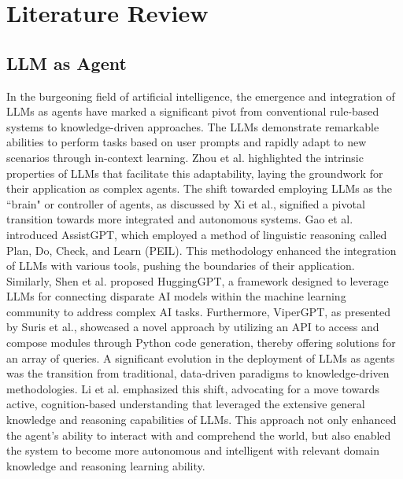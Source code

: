 \documentclass[lettersize,journal]{IEEEtran}
\begin{document}
\section{Literature Review}

\subsection{LLM as Agent}
In the burgeoning field of artificial intelligence, the emergence and integration of LLMs as agents have marked a significant pivot from conventional rule-based systems to knowledge-driven approaches.
The LLMs demonstrate remarkable abilities to perform tasks based on user prompts and rapidly adapt to new scenarios through in-context learning. Zhou et al. highlighted the intrinsic properties of LLMs that facilitate this adaptability, laying the groundwork for their application as complex agents\cite{zhoulanguage}. The shift towarded employing LLMs as the ``brain" or controller of agents, as discussed by Xi et al., signified a pivotal transition towards more integrated and autonomous systems\cite{xi2023rise}.
Gao et al. introduced AssistGPT, which employed a method of linguistic reasoning called Plan, Do, Check, and Learn (PEIL). This methodology enhanced the integration of LLMs with various tools, pushing the boundaries of their application\cite{gao2023assistgpt}. Similarly, Shen et al. proposed HuggingGPT, a framework designed to leverage LLMs for connecting disparate AI models within the machine learning community to address complex AI tasks\cite{shen2024hugginggpt}. Furthermore, ViperGPT, as presented by Suris et al., showcased a novel approach by utilizing an API to access and compose modules through Python code generation, thereby offering solutions for an array of queries\cite{suris2023vipergpt}.
A significant evolution in the deployment of LLMs as agents was the transition from traditional, data-driven paradigms to knowledge-driven methodologies. Li et al. emphasized this shift, advocating for a move towards active, cognition-based understanding that leveraged the extensive general knowledge and reasoning capabilities of LLMs\cite{li2023towards}. This approach not only enhanced the agent's ability to interact with and comprehend the world, but also enabled the system to become more autonomous and intelligent with relevant domain knowledge and reasoning learning ability.
    
\end{document}
